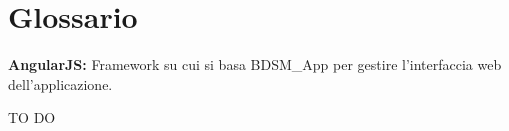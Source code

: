 %

\section{Glossario} %
\label{sec:glossario}
	\textbf{AngularJS:} 
	Framework su cui si basa BDSM\_App per gestire l'interfaccia web dell'applicazione. 
	
	
	TO DO
			









